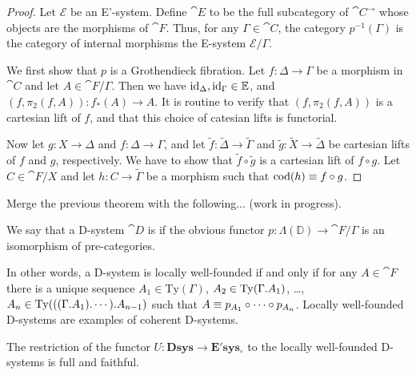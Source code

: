 \begin{proof}
Let $\mathcal{E}$ be an E'-system. Define $\cat{E}$ to be the full subcategory
of $\cat{C}^\to$ whose objects are the morphisms of $\cat{F}$. Thus, for any
$\Gamma\in\cat{C}$, the category $p^{-1}(\Gamma)$ is the category of internal
morphisms the E-system $\mathcal{E}/\Gamma$. 

We first show that $p$ is a Grothendieck fibration. Let $f:\Delta\to\Gamma$ be
a morphism in $\cat{C}$ and let $A\in\cat{F}/\Gamma$. Then we have ${\mathrm{id}_{\Delta}},{\mathrm{id}_{\Gamma}}\in\mathbb{E}$,
and $(f,\pi_2(f,A)):f_\ast(A)\to A$. It is routine to verify that $(f,\pi_2(f,A))$
is a cartesian lift of $f$, and that this choice of catesian lifts is functorial. 

Now let $g:X\to\Delta$ and $f:\Delta\to \Gamma$, and let $\tilde{f}:\tilde{\Delta}\to\tilde{\Gamma}$ and
$\tilde{g}:\tilde{X}\to\tilde{\Delta}$ be cartesian lifts of $f$ and $g$, respectively. We have to show
that $\tilde{f}\circ \tilde{g}$ is a cartesian lift of $f\circ g$. Let $C\in\cat{F}/X$ and
let $h : C\to \tilde{\Gamma}$ be a morphism such that $\mathrm{cod}(h)\equiv f\circ g$. 
\end{proof}

Merge the previous theorem with the following... (work in progress).

\begin{defn}
We say that a D-system $\cat{D}$ is  if the obvious functor
$p:\Lambda(\mathbb{D})\to\cat{F}/\Gamma$ is an isomorphism of pre-categories.
\end{defn}

\begin{rmk}
In other words, a D-system is locally well-founded if and only if
for any $A\in\cat{F}$ there is a unique sequence
$A_1\in\mathrm{Ty}(\Gamma)$, $A_2\in\mathrm{Ty}(\ctxext{\Gamma}{A_1})$, \ldots,
$A_n\in\mathrm{Ty}(\ctxext{{{\Gamma}{A_1}}{\cdots}}{A_{n-1}})$ such that
$A\equiv p_{A_1}\circ\cdots\circ p_{A_n}$. Locally well-founded D-systems 
are examples of coherent D-systems.
\end{rmk}

\begin{thm}
The restriction of the functor $U:\mathbf{Dsys}\to\mathbf{E'sys_{\circ}}$ to the
locally well-founded D-systems is full and faithful.
\end{thm}

